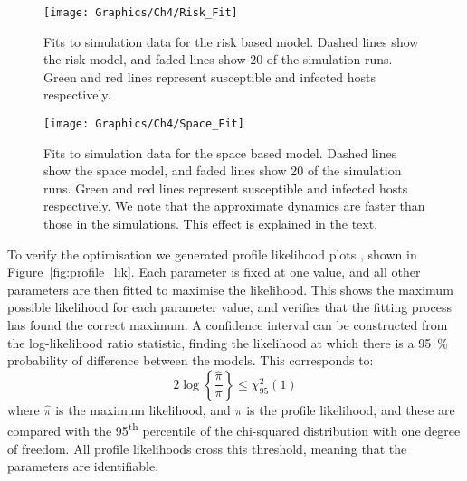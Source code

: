 \begin{figure}[h]
    \begin{center}
        \texttt{[image: Graphics/Ch4/Risk\_Fit]}
        \caption[Risk based approximate model fitted to the network model]{Fits to simulation data for the risk based model. Dashed lines show the risk model, and faded lines show 20 of the simulation runs. Green and red lines represent susceptible and infected hosts respectively.}
        \label{fig:risk_fit}
    \end{center}
\end{figure}

\begin{figure}[h]
    \begin{center}
        \texttt{[image: Graphics/Ch4/Space\_Fit]}
        \caption[Space based approximate model fitted to the network model]{Fits to simulation data for the space based model. Dashed lines show the space model, and faded lines show 20 of the simulation runs. Green and red lines represent susceptible and infected hosts respectively. We note that the approximate dynamics are faster than those in the simulations. This effect is explained in the text.\label{fig:space_fit}}
    \end{center}
\end{figure}

To verify the optimisation we generated profile likelihood plots \citep{bolker_ecological_2008}, shown in Figure~\ref{fig:profile_lik}. Each parameter is fixed at one value, and all other parameters are then fitted to maximise the likelihood. This shows the maximum possible likelihood for each parameter value, and verifies that the fitting process has found the correct maximum. A confidence interval can be constructed from the log-likelihood ratio statistic, finding the likelihood at which there is a \SI{95}{\percent} probability of difference between the models. This corresponds to:
\begin{equation}
    2\log\left\{\frac{\hat{\pi}}{\pi}\right\} \leq \chi^2_{95}(1)
\end{equation}
where $\hat{\pi}$ is the maximum likelihood, and $\pi$ is the profile likelihood, and these are compared with the 95\textsuperscript{th} percentile of the chi-squared distribution with one degree of freedom. All profile likelihoods cross this threshold, meaning that the parameters are identifiable.

